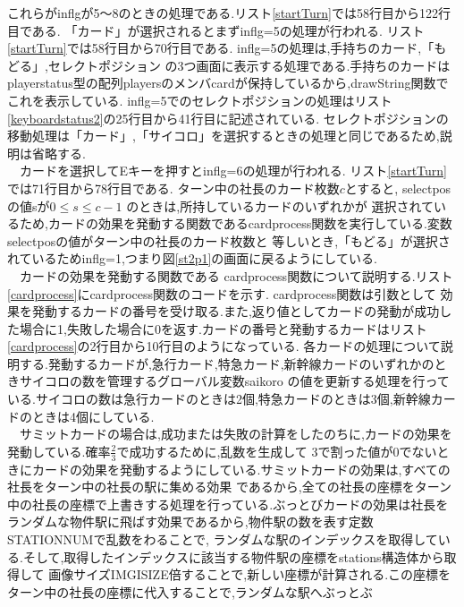 \documentclass[a4j]{jarticle}
\begin{document}
        これらがinflgが5～8のときの処理である.リスト\ref{startTurn}では58行目から122行目である.
        「カード」が選択されるとまずinflg=5の処理が行われる. リスト\ref{startTurn}では58行目から70行目である. 
        inflg=5の処理は,手持ちのカード,「もどる」,セレクトポジション
        の3つ画面に表示する処理である.手持ちのカードはplayerstatus型の配列playersのメンバcardが保持しているから,drawString関数で
        これを表示している. inflg=5でのセレクトポジションの処理はリスト\ref{keyboardstatus2}の25行目から41行目に記述されている.
        セレクトポジションの移動処理は「カード」,「サイコロ」を選択するときの処理と同じであるため,説明は省略する.\\
        　カードを選択してEキーを押すとinflg=6の処理が行われる. リスト\ref{startTurn}では71行目から78行目である. 
        ターン中の社長のカード枚数$c$とすると, selectposの値sが$0 \leq s \leq c-1$ のときは,所持しているカードのいずれかが
        選択されているため,カードの効果を発動する関数であるcardprocess関数を実行している.変数selectposの値がターン中の社長のカード枚数と
        等しいとき,「もどる」が選択されているためinflg=1,つまり図\ref{st2p1}の画面に戻るようにしている.\\
        　カードの効果を発動する関数である
        cardprocess関数について説明する.リスト\ref{cardprocess}にcardprocess関数のコードを示す. cardprocess関数は引数として
        効果を発動するカードの番号を受け取る.また,返り値としてカードの発動が成功した場合に1,失敗した場合に0を返す.カードの番号と発動するカードはリスト\ref{cardprocess}の2行目から10行目のようになっている.
        各カードの処理について説明する.発動するカードが,急行カード,特急カード,新幹線カードのいずれかのときサイコロの数を管理するグローバル変数saikoro
        の値を更新する処理を行っている.サイコロの数は急行カードのときは2個,特急カードのときは3個,新幹線カードのときは4個にしている.\\
        　サミットカードの場合は,成功または失敗の計算をしたのちに,カードの効果を発動している.確率$\frac{2}{3}$で成功するために,乱数を生成して
        3で割った値が0でないときにカードの効果を発動するようにしている.サミットカードの効果は,すべての社長をターン中の社長の駅に集める効果
        であるから,全ての社長の座標をターン中の社長の座標で上書きする処理を行っている.ぶっとびカードの効果は社長をランダムな物件駅に飛ばす効果であるから,物件駅の数を表す定数STATIONNUMで乱数をわることで,
        ランダムな駅のインデックスを取得している.そして,取得したインデックスに該当する物件駅の座標をstations構造体から取得して
        画像サイズIMGISIZE倍することで,新しい座標が計算される.この座標をターン中の社長の座標に代入することで,ランダムな駅へぶっとぶ
\end{document}

